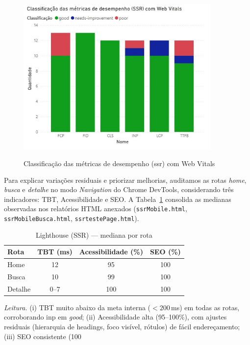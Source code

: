 {\begin{figure}[H]
    \centering
    \caption{Classificação das métricas de desempenho (\acrshort{ssr}) com Web Vitals}
    \includegraphics[width=0.9\textwidth]{media/metricas_ssr_web_vitals.jpeg}
    \label{fig:ssr-webvitals}
\end{figure}

Para explicar variações residuais e priorizar melhorias, auditamos as rotas \emph{home}, \emph{busca} e \emph{detalhe} no modo \emph{Navigation} do Chrome DevTools, considerando três indicadores: TBT, Acessibilidade e SEO. A Tabela~\ref{tab:lh-ssr} consolida as medianas observadas nos relatórios HTML anexados (\texttt{ssrMobile.html}, \texttt{ssrMobileBusca.html}, \texttt{ssrtestePage.html}).

\begin{table}[H]
\centering
\caption{Lighthouse (SSR) — mediana por rota}
\label{tab:lh-ssr}
\begin{tabular}{|l|c|c|c|}
\hline
Rota & TBT (ms) & Acessibilidade (\%) & SEO (\%) \\
\hline
Home    & 12 & 95  & 100 \\
Busca   & 10 & 99  & 100 \\
Detalhe & 0--7\footnotemark[1] & 100 & 100 \\
\hline
\end{tabular}
\end{table}

\noindent \textit{Leitura.}
(i) TBT muito abaixo da meta interna ($<200$\,ms) em todas as rotas, corroborando \acrshort{inp} em \textit{good};
(ii) Acessibilidade alta (95--100\%), com ajustes residuais (hierarquia de headings, foco visível, rótulos) de fácil endereçamento;
(iii) SEO consistente (100%

}
